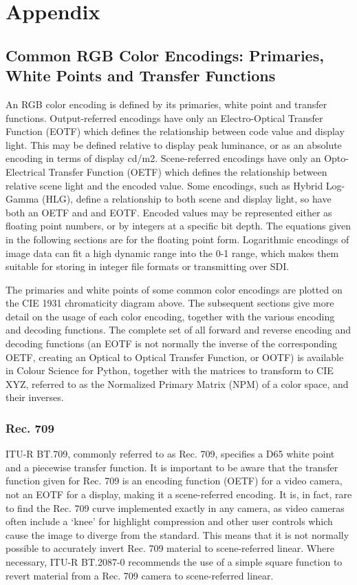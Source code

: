 \chapter{Appendix}

\section{Common RGB Color Encodings: Primaries, White Points and Transfer Functions}





An RGB color encoding is defined by its primaries, white point and transfer functions. Output-referred encodings have only an Electro-Optical Transfer Function (EOTF) which defines the relationship between code value and display light. This may be defined relative to display peak luminance, or as an absolute encoding in terms of display cd/m2. Scene-referred encodings have only an Opto-Electrical Transfer Function (OETF) which defines the relationship between relative scene light and the encoded value. Some encodings, such as Hybrid Log-Gamma (HLG), define a relationship to both scene and display light, so have both an OETF and and EOTF. Encoded values may be represented either as floating point numbers, or by integers at a specific bit depth. The equations given in the following sections are for the floating point form. Logarithmic encodings of image data can fit a high dynamic range into the 0-1 range, which makes them suitable for storing in integer file formats or transmitting over SDI.

The primaries and white points of some common color encodings are plotted on the CIE 1931 chromaticity diagram above. The subsequent sections give more detail on the usage of each color encoding, together with the various encoding and decoding functions. The complete set of all forward and reverse encoding and decoding functions (an EOTF is not normally the inverse of the corresponding OETF, creating an Optical to Optical Transfer Function, or OOTF) is available in Colour Science for Python, together with the matrices to transform to CIE XYZ, referred to as the Normalized Primary Matrix (NPM) of a color space, and their inverses.

\subsection{Rec. 709}

ITU-R BT.709, commonly referred to as Rec. 709, specifies a D65 white point and a piecewise transfer function. It is important to be aware that the transfer function given for Rec. 709 is an encoding function (OETF) for a video camera, not an EOTF for a display, making it a scene-referred encoding. It is, in fact, rare to find the Rec. 709 curve implemented exactly in any camera, as video cameras often include a ‘knee’ for highlight compression and other user controls which cause the image to diverge from the standard. This means that it is not normally possible to accurately invert Rec. 709 material to scene-referred linear. Where necessary, ITU-R BT.2087-0 recommends the use of a simple square function to revert material from a Rec. 709 camera to scene-referred linear.


